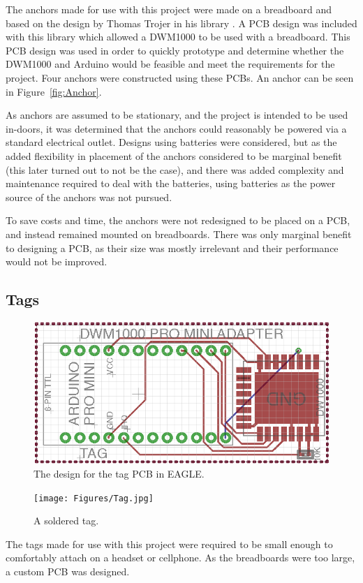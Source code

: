 The anchors made for use with this project were made on a breadboard and based on the design by Thomas Trojer in his  library \cite{ThotroGithub}. A PCB design was included with this library which allowed a DWM1000 to be used with a breadboard. This PCB design was used in order to quickly prototype and determine whether the DWM1000 and Arduino would be feasible and meet the requirements for the project. Four anchors were constructed using these PCBs. An anchor can be seen in Figure~\ref{fig:Anchor}.

As anchors are assumed to be stationary, and the project is intended to be used in-doors, it was determined that the anchors could reasonably be powered via a standard electrical outlet. Designs using batteries were considered, but as the added flexibility in placement of the anchors considered to be marginal benefit (this later turned out to not be the case), and there was added complexity and maintenance required to deal with the batteries, using batteries as the power source of the anchors was not pursued.

To save costs and time, the anchors were not redesigned to be placed on a PCB, and instead remained mounted on breadboards. There was only marginal benefit to designing a PCB, as their size was mostly irrelevant and their performance would not be improved.

\subsection{Tags}
\begin{figure}
	\centering
	\includegraphics[width=\linewidth]{Figures/PCB.png}
	\decoRule
	\caption{The design for the tag PCB in EAGLE.}
	\label{fig:PCB}
\end{figure}

\begin{figure}
	\centering
	\texttt{[image: Figures/Tag.jpg]}
	\decoRule
	\caption{A soldered tag.}
	\label{fig:Tag}
\end{figure}
The tags made for use with this project were required to be small enough to comfortably attach on a headset or cellphone. As the breadboards were too large, a custom PCB was designed.

